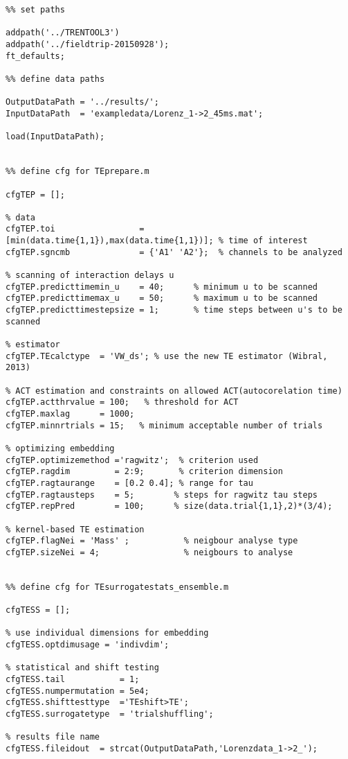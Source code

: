 \begin{lstlisting}
%% set paths

addpath('../TRENTOOL3')
addpath('../fieldtrip-20150928');
ft_defaults;

%% define data paths

OutputDataPath = '../results/';
InputDataPath  = 'exampledata/Lorenz_1->2_45ms.mat';

load(InputDataPath);


%% define cfg for TEprepare.m

cfgTEP = [];

% data
cfgTEP.toi                 = [min(data.time{1,1}),max(data.time{1,1})]; % time of interest
cfgTEP.sgncmb              = {'A1' 'A2'};  % channels to be analyzed

% scanning of interaction delays u
cfgTEP.predicttimemin_u    = 40;      % minimum u to be scanned
cfgTEP.predicttimemax_u    = 50;	  % maximum u to be scanned
cfgTEP.predicttimestepsize = 1; 	  % time steps between u's to be scanned

% estimator
cfgTEP.TEcalctype  = 'VW_ds'; % use the new TE estimator (Wibral, 2013)

% ACT estimation and constraints on allowed ACT(autocorelation time)
cfgTEP.actthrvalue = 100;   % threshold for ACT
cfgTEP.maxlag      = 1000;
cfgTEP.minnrtrials = 15;   % minimum acceptable number of trials

% optimizing embedding
cfgTEP.optimizemethod ='ragwitz';  % criterion used
cfgTEP.ragdim         = 2:9;       % criterion dimension
cfgTEP.ragtaurange    = [0.2 0.4]; % range for tau
cfgTEP.ragtausteps    = 5;        % steps for ragwitz tau steps
cfgTEP.repPred        = 100;      % size(data.trial{1,1},2)*(3/4);

% kernel-based TE estimation
cfgTEP.flagNei = 'Mass' ;           % neigbour analyse type
cfgTEP.sizeNei = 4;                 % neigbours to analyse


%% define cfg for TEsurrogatestats_ensemble.m

cfgTESS = [];

% use individual dimensions for embedding
cfgTESS.optdimusage = 'indivdim';

% statistical and shift testing
cfgTESS.tail           = 1;
cfgTESS.numpermutation = 5e4;
cfgTESS.shifttesttype  ='TEshift>TE';
cfgTESS.surrogatetype  = 'trialshuffling';

% results file name
cfgTESS.fileidout  = strcat(OutputDataPath,'Lorenzdata_1->2_');


\end{lstlisting}
